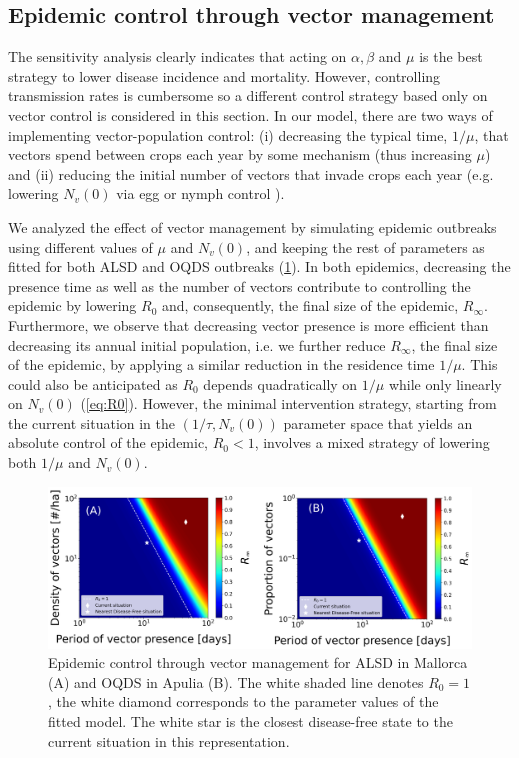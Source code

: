 \subsection{Epidemic control through vector management}

The sensitivity analysis clearly indicates that acting on $\alpha,\beta$
and $\mu$ is the best strategy to lower disease incidence and mortality.
However, controlling transmission rates is cumbersome so a different control
strategy based only on vector control is considered in this section. In our
model, there are two ways of implementing vector-population control: (i)
decreasing the typical time, $1/\mu$, that vectors spend between crops each
year by some mechanism (thus increasing $\mu$) and (ii) reducing the initial
number of vectors that invade crops each year (e.g. lowering $N_v(0)$ via egg
or nymph control \cite{Lago2022}).

We analyzed the effect of vector management by simulating epidemic
outbreaks using different values of $\mu$ and $N_v(0)$, and keeping the rest of
parameters as fitted for both ALSD and OQDS outbreaks
(\cref{fig:control_strategy}). In both epidemics, decreasing the presence time
as well as the number of vectors contribute to controlling the epidemic by
lowering $R_0$ and, consequently, the final size of the epidemic, $R_{\infty}$.
Furthermore, we observe that decreasing vector presence is more efficient than
decreasing its annual initial population, i.e. we further reduce $R_{\infty}$,
the final size of the epidemic, by applying a similar reduction in the
residence time $1/\mu$. This could also be anticipated as $R_0$ depends
quadratically on $1/\mu$ while only linearly on $N_v(0)$ (\cref{eq:R0}).
However, the minimal intervention strategy, starting from the current situation
in the $(1/\tau,N_v(0))$ parameter space that yields an absolute control of the
epidemic, $R_0<1$, involves a mixed strategy of lowering both $1/\mu$ and
$N_v(0)$.

\begin{figure}[H]
    \centering
    \includegraphics[width=\textwidth]{Figures/Control_strategy.png}
    \caption{Epidemic control through vector management for ALSD in
        Mallorca (A) and OQDS in Apulia (B). The white shaded line denotes
        $R_0=1$, the
        white diamond corresponds to the parameter values of the fitted model.
        The
        white star is the closest disease-free state to the current situation
        in this
        representation.}
    \label{fig:control_strategy}
\end{figure}

